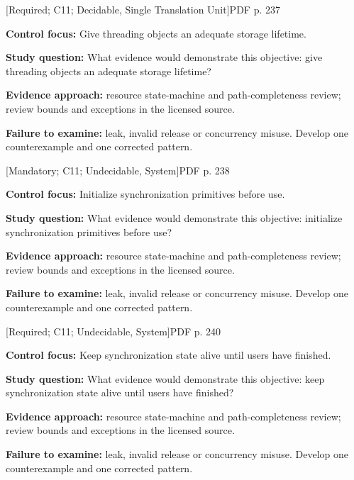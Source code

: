 \documentclass[10pt,letterpaper]{article}
\begin{document}
 \textsf{\footnotesize [Required; C11; Decidable, Single Translation Unit]}\hfill{\footnotesize PDF p. 237}\par
\textbf{Control focus:} Give threading objects an adequate storage lifetime.\par
\textbf{Study question:} What evidence would demonstrate this objective: give threading objects an adequate storage lifetime?\par
\textbf{Evidence approach:} resource state-machine and path-completeness review; review bounds and exceptions in the licensed source.\par
\textbf{Failure to examine:} leak, invalid release or concurrency misuse. Develop one counterexample and one corrected pattern.\par
\smallskip
{}
 \textsf{\footnotesize [Mandatory; C11; Undecidable, System]}\hfill{\footnotesize PDF p. 238}\par
\textbf{Control focus:} Initialize synchronization primitives before use.\par
\textbf{Study question:} What evidence would demonstrate this objective: initialize synchronization primitives before use?\par
\textbf{Evidence approach:} resource state-machine and path-completeness review; review bounds and exceptions in the licensed source.\par
\textbf{Failure to examine:} leak, invalid release or concurrency misuse. Develop one counterexample and one corrected pattern.\par
\smallskip
{}
 \textsf{\footnotesize [Required; C11; Undecidable, System]}\hfill{\footnotesize PDF p. 240}\par
\textbf{Control focus:} Keep synchronization state alive until users have finished.\par
\textbf{Study question:} What evidence would demonstrate this objective: keep synchronization state alive until users have finished?\par
\textbf{Evidence approach:} resource state-machine and path-completeness review; review bounds and exceptions in the licensed source.\par
\textbf{Failure to examine:} leak, invalid release or concurrency misuse. Develop one counterexample and one corrected pattern.\par
\smallskip
{}
\end{document}
